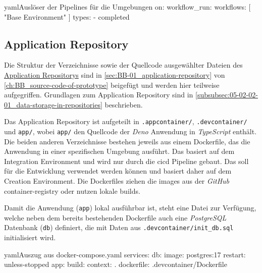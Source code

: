 \begin{codebox}{yaml}{Auslöser der Pipelines für die Umgebungen}
on:
    workflow_run:
        workflows: [ "Base Environment" ]
        types:
            - completed
\end{codebox}

\subsection{Application Repository}
\label{subsec:06-02-03_application-repository}

Die Struktur der Verzeichnisse sowie der Quellcode ausgewählter Dateien des \hyperref[sec:BB-01_application-repository]{Application Repositorys} sind in \autoref{sec:BB-01_application-repository} von \autoref{ch:BB_source-code-of-prototype} beigefügt und werden hier teilweise aufgegriffen. Grundlagen zum Application Repository sind in \autoref{subsubsec:05-02-02-01_data-storage-in-repositories} beschrieben.

Das Application Repository ist aufgeteilt in \texttt{.appcontainer/}, \texttt{.devcontainer/} und \texttt{app/}, wobei \texttt{app/} den Quellcode der \textit{Deno} Anwendung in \textit{TypeScript} enthält. Die beiden anderen Verzeichnisse bestehen jeweils aus einem Dockerfile, das die Anwendung in einer spezifischen Umgebung ausführt. Das  basiert auf dem Integration Environment und wird nur durch die \Gls{cicd} Pipeline  gebaut. Das  soll für die Entwicklung verwendet werden können und basiert daher auf dem Creation Environment. Die Dockerfiles ziehen die \Glspl{image} aus der \textit{GitHub} \Gls{container-registry} oder nutzen lokale \Glspl{build}.

Damit die Anwendung (\texttt{app}) lokal ausführbar ist, steht eine  Datei zur Verfügung, welche neben dem bereits bestehenden Dockerfile auch eine \textit{PostgreSQL} Datenbank (\texttt{db}) definiert, die mit Daten aus \texttt{.devcontainer/init\_db.sql} initialisiert wird.

\begin{codebox}{yaml}{Auszug aus docker-compose.yaml}
services:
    db:
        image: postgres:17
        restart: unless-stopped
    app:
        build:
            context: .
            dockerfile: .devcontainer/Dockerfile
\end{codebox}

